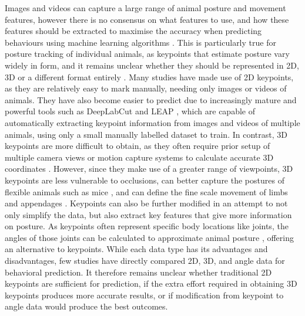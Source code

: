 \documentclass[11pt, letterpaper]{article} %
\begin{document}
    
    \noindent Images and videos can capture a large range of animal posture and movement features, however there is no consensus on what features to use, and how these features should be extracted to maximise the accuracy when predicting behaviours using machine learning algorithms \citep{behav_across_scales_2018}. This is particularly true for posture tracking of individual animals, as keypoints that estimate posture vary widely in form, and it remains unclear whether they should be represented in 2D, 3D or a different format entirely \citep{pereira_quantifying_2020, mathis_deeplearning_2020}.
    Many studies have made use of 2D keypoints, as they are relatively easy to mark manually, needing only images or videos of animals. They have also become easier to predict due to increasingly mature and powerful tools such as DeepLabCut \citep{mathis_deeplabcut_2018} and LEAP \citep{LEAP_2019}, which are capable of automatically extracting keypoint information from images and videos of multiple animals, using only a small manually labelled dataset to train. In contrast, 3D keypoints are more difficult to obtain, as they often require prior setup of multiple camera views or motion capture systems to calculate accurate 3D coordinates \citep{joska_acinoset_2021, waldmann_3d-muppet_2023}. However, since they make use of a greater range of viewpoints, 3D keypoints are less vulnerable to occlusions, can better capture the postures of flexible animals such as mice \citep{pereira_quantifying_2020}, and can define the fine scale movement of limbs and appendages \citep{3D_macaque_2020, 3D_monkey_2023}. Keypoints can also be further modified in an attempt to not only simplify the data, but also extract key features that give more information on posture. As keypoints often represent specific body locations like joints, the angles of those joints can be calculated to approximate animal posture \citep{raspa_studying_2021, ferres_predicting_2022}, offering an alternative to keypoints. While each data type has its advantages and disadvantages, few studies have directly compared 2D, 3D, and angle data for behavioral prediction. It therefore remains unclear whether traditional 2D keypoints are sufficient for prediction, if the extra effort required in obtaining 3D keypoints produces more accurate results, or if modification from keypoint to angle data would produce the best outcomes. \\
    
\end{document}
